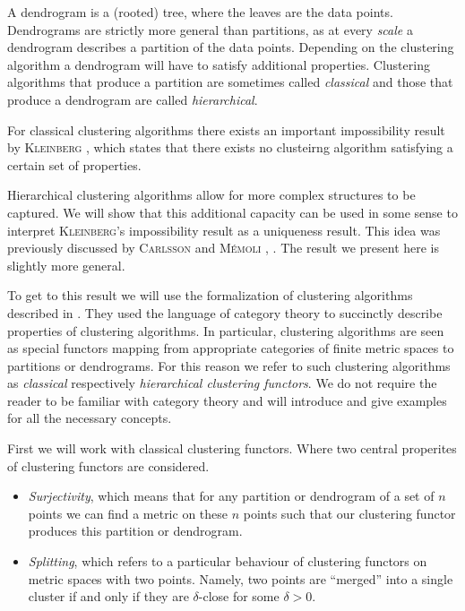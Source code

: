 A dendrogram is a (rooted) tree, where the leaves are the data points. Dendrograms are strictly more general than partitions, as at every \emph{scale} a dendrogram describes a partition of the data points.
Depending on the clustering algorithm a dendrogram will have to satisfy additional properties.
Clustering algorithms that produce a partition are sometimes called \emph{classical} and those that produce a dendrogram are called \emph{hierarchical}.


For classical clustering algorithms there exists an important impossibility result by \textsc{Kleinberg} \cite{Kleinberg2002}, which states that there exists no clusteirng algorithm satisfying a certain set of properties.

Hierarchical clustering algorithms allow for more complex structures to be captured. We will show that this additional capacity can be used in some sense to interpret \textsc{Kleinberg}'s impossibility result as a uniqueness result. This idea was previously discussed by \textsc{Carlsson} and \textsc{M\'emoli} \cite{JMLR:v11:carlsson10a}, \cite{Carlsson2010}. The result we present here is slightly more general.

To get to this result we will use the formalization of clustering algorithms described in \cite{Carlsson2010}. They used the language of category theory to succinctly describe properties of clustering algorithms. In particular, clustering algorithms are seen as special functors mapping from appropriate categories of finite metric spaces to partitions or dendrograms. For this reason we refer to such clustering algorithms as \emph{classical} respectively \emph{hierarchical clustering functors}. We do not require the reader to be familiar with category theory and will introduce and give examples for all the necessary concepts.

First we will work with classical clustering functors. Where two central properites of clustering functors are considered.
\begin{itemize}
    \item \emph{Surjectivity}, which means that for any partition or dendrogram of a set of $n$ points we can find a metric on these $n$ points such that our clustering functor produces this partition or dendrogram.
    \item \emph{Splitting}, which refers to a particular behaviour of clustering functors on metric spaces with two points. Namely, two points are ``merged'' into a single cluster if and only if they are $\delta$-close for some $\delta > 0$.
\end{itemize}

